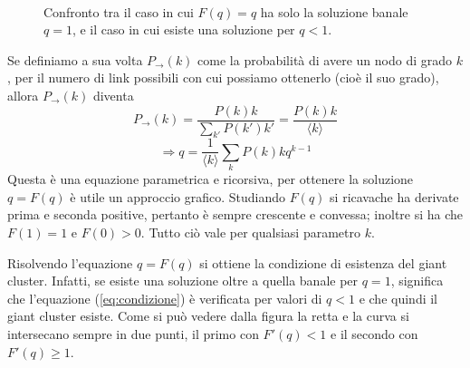 \begin{figure}[t!]
	\centering
	$\;$
	\caption[Esistenza soluzione non banale.]{Confronto tra il caso in cui $F(q)=q$ ha solo la soluzione banale $q=1$, e il caso in cui esiste una soluzione per $q<1$.}
	\label{fig:banalita}
\end{figure}

Se definiamo a sua volta $P_{\rightarrow}(k)$ come la probabilità di avere un nodo di grado $k$, per il numero di link possibili con cui possiamo ottenerlo (cioè il suo grado), allora $P_{\rightarrow}(k)$ diventa
$$P_{\rightarrow}(k) = \frac{P(k)k}{\sum_{k'}P(k')k'} = \frac{P(k)k}{\langle k \rangle}$$
$$\Rightarrow q = \frac{1}{\langle k \rangle}\sum_k P(k)kq^{k-1} $$
Questa è una equazione parametrica e ricorsiva, per ottenere la soluzione $q = F(q)$ è utile un approccio grafico. Studiando $F(q)$ si ricavache ha derivate prima e seconda positive, pertanto è sempre crescente e convessa; inoltre si ha che $F(1) = 1$ e $F(0)>0$. Tutto ciò vale per qualsiasi parametro $k$.

Risolvendo l'equazione $q = F(q)$ si ottiene la condizione di esistenza del giant cluster. Infatti, se esiste una soluzione oltre a quella banale per $q=1$, significa che l'equazione (\ref{eq:condizione}) è verificata per valori di $q < 1$ e che quindi il giant cluster esiste. Come si può vedere dalla figura la retta e la curva si intersecano sempre in due punti, il primo con $F'(q) < 1$ e il secondo con $F'(q) \geq 1$.

